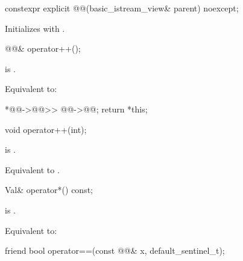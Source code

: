 %
\begin{itemdecl}
constexpr explicit @@(basic_istream_view& parent) noexcept;
\end{itemdecl}

\begin{itemdescr}
\pnum
\effects
Initializes  with .
\end{itemdescr}

%
\begin{itemdecl}
@@& operator++();
\end{itemdecl}

\begin{itemdescr}
\pnum
\expects
{} is .

\pnum
\effects
Equivalent to:
\begin{codeblock}
*@@->@@>> @@->@@;
return *this;
\end{codeblock}
\end{itemdescr}

%
\begin{itemdecl}
void operator++(int);
\end{itemdecl}

\begin{itemdescr}
\pnum
\expects
{} is .

\pnum
\effects
Equivalent to .
\end{itemdescr}

%
\begin{itemdecl}
Val& operator*() const;
\end{itemdecl}

\begin{itemdescr}
\pnum
\expects
{} is .

\pnum
\effects
Equivalent to: 
\end{itemdescr}

%
\begin{itemdecl}
friend bool operator==(const @@& x, default_sentinel_t);
\end{itemdecl}

